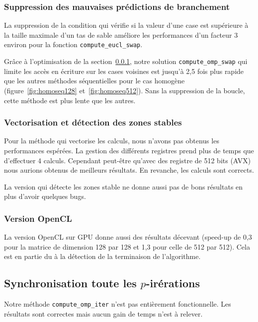\subsubsection{Suppression des mauvaises prédictions de branchement}
\label{sec:predict}

La suppression de la condition qui vérifie si la valeur d'une case est
supérieure à la taille maximale d'un tas de sable améliore les
performances d'un facteur 3 environ pour la fonction
\texttt{compute\_eucl\_swap}.
\medskip

Grâce à l'optimisation de la section~\ref{sec:predict}, notre solution
\texttt{compute\_omp\_swap} qui limite les accès en écriture sur les
cases voisines est jusqu'à 2,5 fois plus rapide que les autres
méthodes séquentielles pour le cas homogène
(figure~\ref{fig:homoseq128} et~\ref{fig:homoseq512}). Sans la
suppression de la boucle, cette méthode est plus lente que les autres.

\subsubsection{Vectorisation et détection des zones stables}

Pour la méthode qui vectorise les calculs, nous n'avons pas obtenus
les performances espérées. La gestion des différents registres prend
plus de temps que d'effectuer 4 calculs. Cependant peut-être qu'avec
des registre de 512 bits (AVX) nous aurions obtenus de meilleurs
résultats. En revanche, les calculs sont corrects.

La version qui détecte les zones stable ne donne aussi pas de bons
résultats en plus d'avoir quelques bugs.

\subsubsection{Version OpenCL}
\label{sec:res-opencl}

La version OpenCL sur GPU donne aussi des résultats décevant (speed-up
de 0,3 pour la matrice de dimension 128 par 128 et 1,3 pour celle de
512 par 512). Cela est en partie du à la détection de la terminaison
de l'algorithme.

\subsection{Synchronisation toute les $p$-irérations}

Notre méthode \texttt{compute\_omp\_iter} n'est pas entièrement
fonctionnelle. Les résultats sont correctes mais aucun gain de temps
n'est à relever.

